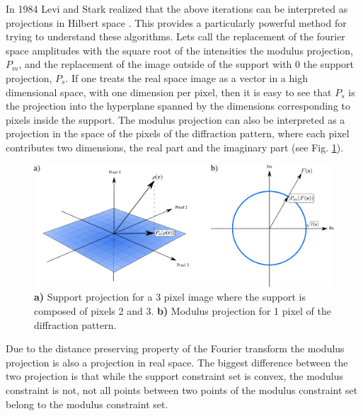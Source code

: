 In 1984 Levi and Stark realized that the above iterations can be
interpreted as projections in Hilbert space \cite{Levi84}. This provides a
particularly powerful method for trying to understand these algorithms.
Lets call the replacement of the fourier space amplitudes with the square root of
the intensities the modulus projection, $P_m$, and the replacement of the image
outside of the support with 0 the support projection, $P_s$. If one treats the
real space image as a vector in a high dimensional space, with one dimension per
pixel, then it is easy to see that $P_s$ is the projection into the hyperplane
spanned by the dimensions corresponding to pixels inside the support. The
modulus projection can also be interpreted as a projection in the space of the
pixels of the diffraction pattern, where each pixel contributes two dimensions,
the real part and the imaginary part (see Fig. \ref{Fig:Projections}). 

\begin{figure}[h]
  \centering
  \includegraphics[width=1 \columnwidth]{projections.png}
  \caption{{\bf a)} Support projection for a 3 pixel image where the support is
    composed of pixels 2 and 3. {\bf b)} Modulus projection for 1 pixel of the
    diffraction pattern.}
  \label{Fig:Projections}
\end{figure}

Due to the distance preserving property of the Fourier transform the modulus
projection is also a projection in real space. The biggest difference between
the two projection is that while the support constraint set is convex, the
modulus constraint is not, not all points between two points of the modulus
constraint set belong to the modulus constraint set.
